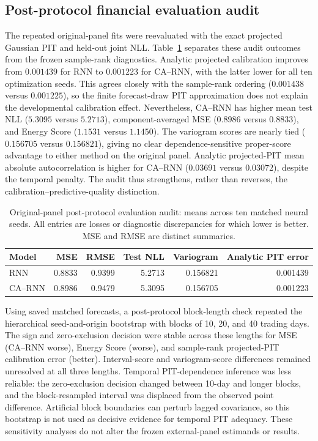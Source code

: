\documentclass[11pt]{article}
\begin{document}
\subsection{Post-protocol financial evaluation audit}

The repeated original-panel fits were reevaluated with the exact projected
Gaussian PIT and held-out joint NLL. Table~\ref{tab:financial-audit} separates
these audit outcomes from the frozen sample-rank diagnostics. Analytic projected
calibration improves from $0.001439$ for RNN to $0.001223$ for CA--RNN, with
the latter lower for all ten optimization seeds. This agrees closely with the
sample-rank ordering ($0.001438$ versus $0.001225$), so the finite forecast-draw
PIT approximation does not explain the developmental calibration effect.
Nevertheless, CA--RNN has higher mean test NLL ($5.3095$ versus $5.2713$),
component-averaged MSE ($0.8986$ versus $0.8833$), and Energy Score ($1.1531$
versus $1.1450$). The variogram scores are nearly tied ($0.156705$ versus
$0.156821$), giving no clear dependence-sensitive proper-score advantage to
either method on the original panel. Analytic projected-PIT mean absolute
autocorrelation is higher for CA--RNN ($0.03691$ versus $0.03072$), despite the
temporal penalty. The audit thus strengthens, rather than reverses, the
calibration--predictive-quality distinction.

\begin{table}[ht]
\centering
\caption{Original-panel post-protocol evaluation audit: means across ten
matched neural seeds. All entries are losses or diagnostic discrepancies for
which lower is better. MSE and RMSE are distinct summaries.}
\label{tab:financial-audit}
\begin{tabular}{lrrrrr}
\toprule
Model & MSE & RMSE & Test NLL & Variogram & Analytic PIT error \\
\midrule
RNN & 0.8833 & 0.9399 & 5.2713 & 0.156821 & 0.001439 \\
CA--RNN & 0.8986 & 0.9479 & 5.3095 & 0.156705 & 0.001223 \\
\bottomrule
\end{tabular}
\end{table}

Using saved matched forecasts, a post-protocol block-length check repeated the
hierarchical seed-and-origin bootstrap with blocks of 10, 20, and 40 trading
days. The sign and zero-exclusion decision were stable across these lengths for
MSE (CA--RNN worse), Energy Score (worse), and sample-rank projected-PIT
calibration error (better). Interval-score and variogram-score differences
remained unresolved at all three lengths. Temporal PIT-dependence inference was
less reliable: the zero-exclusion decision changed between 10-day and longer
blocks, and the block-resampled interval was displaced from the observed point
difference. Artificial block boundaries can perturb lagged covariance, so this
bootstrap is not used as decisive evidence for temporal PIT adequacy. These
sensitivity analyses do not alter the frozen external-panel estimands or results.
\end{document}
